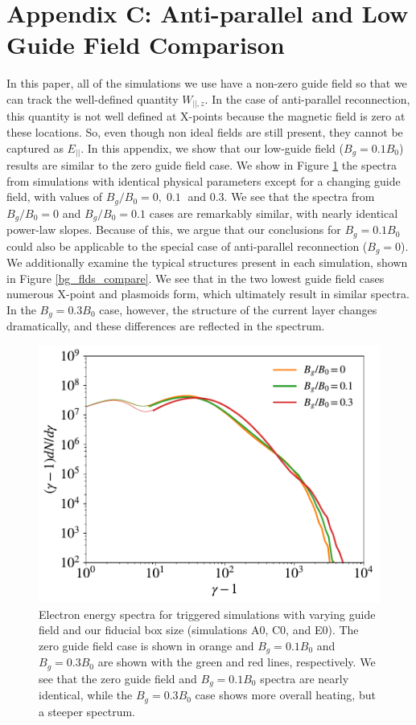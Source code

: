 \section{Appendix C: Anti-parallel and Low Guide Field Comparison}
In this paper, all of the simulations we use have a non-zero guide field so that we can track the well-defined quantity $W_{||,z}$.  In the case of anti-parallel reconnection, this quantity is not well defined at X-points because the magnetic field is zero at these locations. So, even though non ideal fields are still present, they cannot be captured as $E_{||}$.  In this appendix, we show that our low-guide field ($B_{g}=0.1B_{0}$) results are similar to the zero guide field case.  We show in Figure \ref{bg_spec_compare} the spectra from simulations with identical physical parameters except for a changing guide field, with values of $B_{g}/B_{0}=0, \; 0.1\; $ and $0.3$.  We see that the spectra from $B_{g}/B_{0}=0$ and $B_{g}/B_{0}=0.1$ cases are remarkably similar, with nearly identical power-law slopes. Because of this, we argue that our conclusions for $B_{g}=0.1 B_{0}$ could also be applicable to the special case of anti-parallel reconnection ($B_{g}=0$).  We additionally examine the typical structures present in each simulation, shown in Figure \ref{bg_flds_compare}.  We see that in the two lowest guide field cases numerous X-point and plasmoids form, which ultimately result in similar spectra.  In the $B_{g}=0.3B_{0}$ case, however, the structure of the current layer changes dramatically, and these differences are reflected in the spectrum.  

\begin{figure}[htp] 
	\includegraphics[width=\linewidth]{bg_spec_compare.pdf}
	\caption{Electron energy spectra for triggered simulations with varying guide field and our fiducial box size (simulations A0, C0, and E0).  The zero guide field case is shown in orange and $B_{g}=0.1B_{0}$ and $B_{g}=0.3B_{0}$ are shown with the green and red lines, respectively.  We see that the zero guide field and $B_{g}=0.1B_{0}$ spectra are nearly identical, while the $B_{g}=0.3B_{0}$ case shows more overall heating, but a steeper spectrum.}
	\label{bg_spec_compare}
\end{figure}

